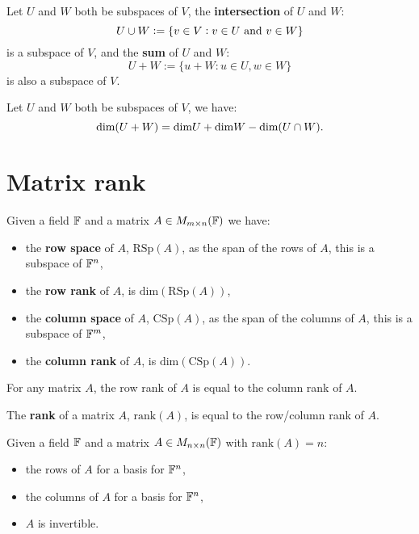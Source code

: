\documentclass[../Year1/Year1.tex]{subfiles}
\begin{document}
\begin{definition}
    Let $U$ and $W$ both be subspaces of $V$, the \textbf{intersection} of $U$ and $W$: \[
        U\cup W := \{v\in V: v\in U  \ \text{\textcolor{black}{ and }} v\in W\}
    \]
    is a subspace of $V$, and the \textbf{sum} of $U$ and $W$: \[
        U + W := \{u + W: u\in U, w\in W\}
    \]
    is also a subspace of $V$.
\end{definition}

\begin{theorem}
    Let $U$ and $W$ both be subspaces of $V$, we have: \[
        \text{dim}(U+W)=\text{dim}U+\text{dim}W-\text{dim}(U\cap W)
    \textcolor{black}{.}
    \]
\end{theorem}

\section{Matrix rank}
\begin{definition}
    Given a field $\mathbb{F}$ and a matrix $A\in M_{m\times n}(\mathbb{F})$ we have: \begin{itemize}
        \item the \textbf{row space} of $A$, $\text{RSp}(A)$, as the span of the rows of $A$, this is a subspace of $\mathbb{F}^n$,
        \item the \textbf{row rank} of $A$, is $\text{dim}(\text{RSp}(A))$,
        \item the \textbf{column space} of $A$, $\text{CSp}(A)$, as the span of the columns of $A$, this is a subspace of $\mathbb{F}^m$,
        \item the \textbf{column rank} of $A$, is $\text{dim}(\text{CSp}(A))$.
    \end{itemize}
\end{definition}

\begin{theorem}
    For any matrix $A$, the row rank of $A$ is equal to the column rank of $A$.
\end{theorem}

\begin{definition}
    The \textbf{rank} of a matrix $A$, $\text{rank}(A)$, is equal to the row/column rank of $A$.
\end{definition}

 \begin{theorem}
     Given a field $\mathbb{F}$ and a matrix $A\in M_{n\times n}(\mathbb{F})$ with $\text{rank}(A)=n$: \begin{itemize}
         \item the rows of $A$ for a basis for $\mathbb{F}^n$,
         \item the columns of $A$ for a basis for $\mathbb{F}^n$,
         \item $A$ is invertible.
     \end{itemize}
 \end{theorem}
\end{document}
